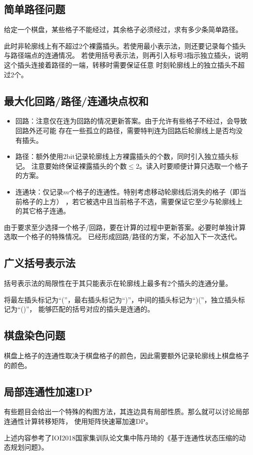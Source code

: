\subsection{简单路径问题}
给定一个棋盘，某些格子不能经过，其余格子必须经过，求有多少条简单路径。

此时非轮廓线上有不超过2个裸露插头。若使用最小表示法，则还要记录每个插头与路径端点的连通情况。
若使用括号表示法，则再引入标号3指示独立插头，说明这个插头连接着路径的一端，转移时需要保证任意
时刻轮廓线上的独立插头不超过2个。
\subsection{最大化回路/路径/连通块点权和}
\begin{itemize}
    \item 回路：注意仅在连为回路的情况更新答案。由于允许有些格子不经过，会导致回路外还可能
    存在一些孤立的路径，需要特判连为回路后轮廓线上是否均没有插头。
    \item 路径：额外使用2bit记录轮廓线上方裸露插头的个数，同时引入独立插头标记。
    注意要始终保证裸露插头的个数$\leq 2$。读入时要顺便计算只选取一个格子的方案。
    \item 连通块：仅记录$m$个格子的连通性。特别考虑移动轮廓线后消失的格子（即当前格子的上方）
    ，若它被选中且当前格子不选，需要保证它至少与轮廓线上的其它格子连通。
\end{itemize}

由于要求至少选择一个格子/回路，要在计算的过程中更新答案。必要时单独计算选取一个格子的特殊情况。
已经形成回路/路径的方案，不必加入下一次迭代。
\subsection{广义括号表示法}
括号表示法的局限性在于其只能表示在轮廓线上最多有2个插头的连通分量。

将最左插头标记为``(''，最右插头标记为``)''，中间的插头标记为``)(''，独立插头标记为``()''，
能够匹配的括号对应的插头是连通的。
\subsection{棋盘染色问题}
棋盘上格子的连通性取决于棋盘格子的颜色，因此需要额外记录轮廓线上棋盘格子的颜色。
\subsection{局部连通性加速DP}
有些题目会给出一个特殊的构图方法，其连边具有局部性质。那么就可以讨论局部连通性计算转移矩阵，
使用矩阵快速幂加速DP。

上述内容参考了IOI2018国家集训队论文集中陈丹琦的《基于连通性状态压缩的动态规划问题》。
